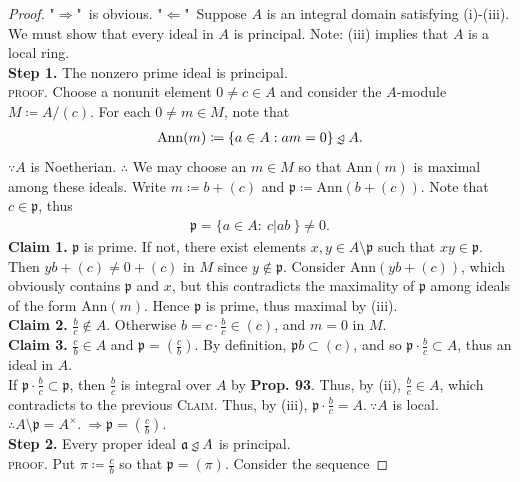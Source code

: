 \documentclass[12pt,a4paper,footinclude=true,headinclude=true]{scrbook} %
\newcommand{\trianglerightneq}{\mathrel{\ooalign{\raisebox{-0.5ex}{\reflectbox{\rotatebox{90}{$\nshortmid$}}}\cr$\triangleright$\cr}\mkern-3mu}}
\newcommand{\triangleleftneq}{\mathrel{\reflectbox{$\trianglerightneq$}}}
\begin{document}
\begin{proof}
    "$\Rightarrow$"\ is obvious. "$\Leftarrow$"\ Suppose $A$ is an integral domain satisfying (i)-(iii). We must show that every ideal in $A$ is principal. Note: (iii) implies that $A$ is a local ring.\\
    \textbf{Step 1.} The nonzero prime ideal is principal.\\ \textsc{proof.}
    Choose a nonunit element $0\neq c\in A$ and consider the $A$-module $M\coloneqq A/(c)$. For each $0\neq m\in M$, note that 
    \begin{align*}
        \mathrm{Ann}(m)\coloneqq\{a\in A:am=0\}\triangleleftneq A.
    \end{align*}
    $\because A$ is Noetherian. $\therefore$ We may choose an $m\in M$ so that $\mathrm{Ann}(m)$ is maximal among these ideals. Write $m\coloneqq b+(c)$ and $\mathfrak{p}\coloneqq\mathrm{Ann} (b+(c))$. Note that $c\in\mathfrak{p}$, thus
    \begin{align*}
        \mathfrak{p}=\{a\in A:\ c|ab\ \}\neq0.
    \end{align*}
    \textbf{Claim 1.} $\mathfrak{p}$ is prime. If not, there exist elements $x,y\in A\setminus\mathfrak{p}$ such that $xy\in \mathfrak{p}$. Then $yb+(c)\neq0+(c)$ in $M$ since $y\notin\mathfrak{p}$. Consider $\mathrm{Ann}(yb+(c))$, which obviously contains $\mathfrak{p}$ and $x$, but this contradicts the maximality of $\mathfrak{p}$ among ideals of the form $\mathrm{Ann}(m)$. Hence $\mathfrak{p}$ is prime, thus maximal by (iii).\\
    \textbf{Claim 2.} $\frac{b}{c}\notin A$. Otherwise $b=c\cdot\frac{b}{c}\in(c)$, and $m=0$ in $M$.\\
    \textbf{Claim 3.} $\frac{c}{b}\in A$ and $\mathfrak{p}=(\frac{c}{b})$. By definition, $\mathfrak{p}b\subset(c)$, and so $\mathfrak{p}\cdot \frac{b}{c}\subset A$, thus an ideal in $A$.\\ If $\mathfrak{p} \cdot\frac{b}{c}\subset\mathfrak{p}$, then $\frac{b}{c}$ is integral over $A$ by \textbf{Prop. 93}. Thus, by (ii), $\frac{b}{c}\in A$, which contradicts to the previous \textsc{Claim}. Thus, by (iii), $\mathfrak{p}\cdot\frac{b}{c}=A.\ \because A$ is local.  $\therefore A\setminus\mathfrak{p}=A^\times.\ \Rightarrow\mathfrak{p}= (\frac{c}{b})$.\\
    \textbf{Step 2.} Every proper ideal $\mathfrak{a}\triangleleftneq A$ is principal.\\ \textsc{proof.}
    Put $\pi\coloneqq\frac{c}{b}$ so that $\mathfrak{p}=(\pi)$. Consider the sequence

\end{proof}
\end{document}
